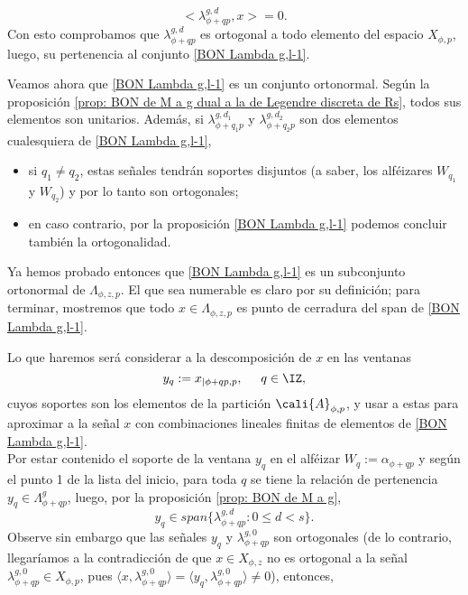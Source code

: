 \begin{dem}
\begin{equation*}
< \lambda^{g,d}_{\phi+qp} , x > = 0.
\end{equation*}
Con esto comprobamos que $\lambda^{g,d}_{\phi+qp} $
es ortogonal a todo elemento del espacio $X_{\phi, p}$, luego, 
su pertenencia al conjunto \eqref{BON Lambda g,l-1}.



Veamos ahora que \eqref{BON Lambda g,l-1} 
es un conjunto ortonormal.
Según la 
proposición \ref{prop: BON de M a g dual a la de Legendre discreta de Rs}, 
todos sus elementos son unitarios. Además,
si $\lambda^{g,d_{1}}_{\phi+q_{1}p}$ y
$\lambda^{g,d_{2}}_{\phi+q_{2}p}$ son dos elementos cualesquiera
de \eqref{BON Lambda g,l-1}, 
\begin{itemize}
\item si $q_{1} \neq q_{2}$, estas señales tendrán soportes
disjuntos (a saber, los alféizares $W_{q_{1}}$ y $W_{q_{2}}$)
y por lo tanto son ortogonales;
\item en caso contrario, por la 
proposición \eqref{BON Lambda g,l-1} podemos concluir
también la ortogonalidad.
\end{itemize}
Ya hemos probado entonces que \eqref{BON Lambda g,l-1}
es un subconjunto ortonormal de $\Lambda_{\phi, z, p}$. 
El que sea numerable es claro por su definición;
para terminar, mostremos que todo $x \in \Lambda_{\phi, z, p}$
es punto de cerradura del span de \eqref{BON Lambda g,l-1}. 

Lo que haremos será considerar a la descomposición de $x$
en las ventanas
\[
y_{q}:=x_{|\phi+qp, p}, \hspace{0.5cm} q \in \IZ,
\]
cuyos soportes son los
elementos de la partición $\cali{A}_{\phi ,p}$, y usar 
a estas para aproximar a 
la señal $x$ con combinaciones lineales
finitas de elementos de \eqref{BON Lambda g,l-1}. \\

Por estar contenido el soporte de la ventana $y_{q}$
en el alféizar $W_{q}:=\alpha_{\phi + qp}$ y
según el punto 1 de la lista del inicio, para toda $q$
se tiene la relación de pertenencia
$y_{q} \in \Lambda^{g}_{\phi+qp}$,
luego, por la proposición \ref{prop: BON de M a g},
\[
y_{q} \in span\{ \lambda^{g,d}_{\phi+qp} : 0\leq  d<s \}.
\]
Observe sin embargo que las señales
$y_{q}$ y $\lambda^{g,0}_{\phi+qp}$ son ortogonales (de
lo contrario, llegaríamos a la contradicción de que
$x \in X_{\phi, z}$ no es 
ortogonal a la señal $\lambda_{\phi+qp}^{g,0} \in X_{\phi, p}$,
pues
$
\langle x , \lambda_{\phi+qp}^{g,0}  \rangle
= \langle y_{q} , \lambda_{\phi+qp}^{g,0}  \rangle \neq 0
$), entonces,


\end{dem}
